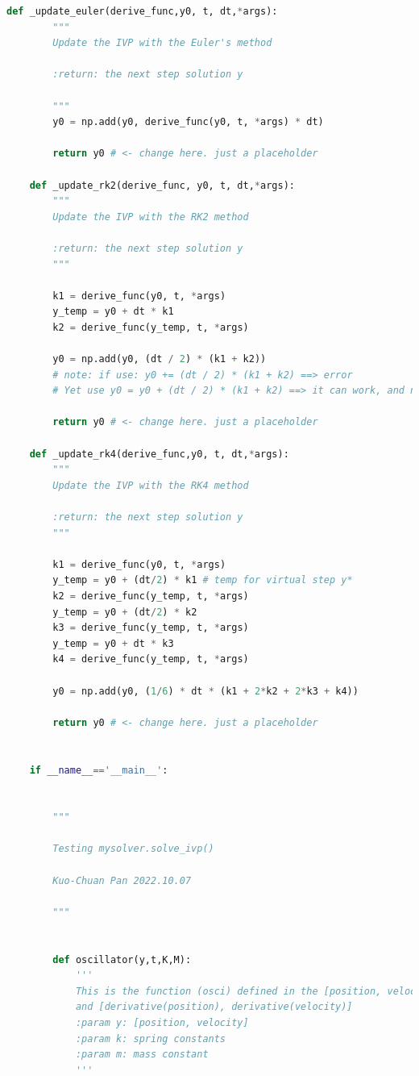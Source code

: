 \documentclass[12pt]{article}
\begin{document}
\begin{lstlisting}[language={Python}]
    def _update_euler(derive_func,y0, t, dt,*args):
        """
        Update the IVP with the Euler's method

        :return: the next step solution y

        """
        y0 = np.add(y0, derive_func(y0, t, *args) * dt)

        return y0 # <- change here. just a placeholder

    def _update_rk2(derive_func, y0, t, dt,*args):
        """
        Update the IVP with the RK2 method

        :return: the next step solution y
        """

        k1 = derive_func(y0, t, *args)
        y_temp = y0 + dt * k1 
        k2 = derive_func(y_temp, t, *args) 
        
        y0 = np.add(y0, (dt / 2) * (k1 + k2))
        # note: if use: y0 += (dt / 2) * (k1 + k2) ==> error
        # Yet use y0 = y0 + (dt / 2) * (k1 + k2) ==> it can work, and np.add() can work too.

        return y0 # <- change here. just a placeholder

    def _update_rk4(derive_func,y0, t, dt,*args):
        """
        Update the IVP with the RK4 method

        :return: the next step solution y
        """

        k1 = derive_func(y0, t, *args)
        y_temp = y0 + (dt/2) * k1 # temp for virtual step y*
        k2 = derive_func(y_temp, t, *args)
        y_temp = y0 + (dt/2) * k2
        k3 = derive_func(y_temp, t, *args)
        y_temp = y0 + dt * k3
        k4 = derive_func(y_temp, t, *args)
        
        y0 = np.add(y0, (1/6) * dt * (k1 + 2*k2 + 2*k3 + k4))

        return y0 # <- change here. just a placeholder


    if __name__=='__main__':


        """
        
        Testing mysolver.solve_ivp()

        Kuo-Chuan Pan 2022.10.07

        """


        def oscillator(y,t,K,M):
            '''
            This is the function (osci) defined in the [position, velocity] 
            and [derivative(position), derivative(velocity)]
            :param y: [position, velocity]
            :param k: spring constants
            :param m: mass constant
            '''
            

\end{lstlisting}
\end{document}
